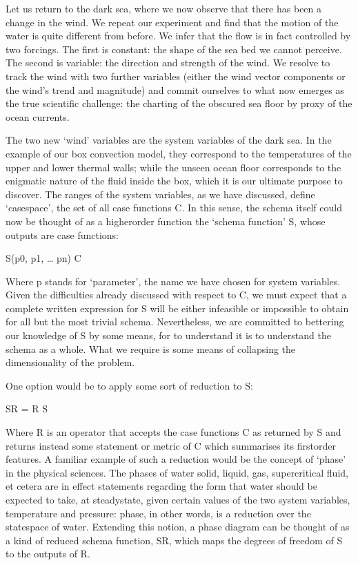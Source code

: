\documentclass[letterpaper,10pt,english]{jupyterBook}
\begin{document}
\sphinxAtStartPar
Let us return to the dark sea, where we now observe that there has been a change in the wind. We repeat our experiment and find that the motion of the water is quite different from before. We infer that the flow is in fact controlled by two forcings. The first is constant: the shape of the sea bed we cannot perceive. The second is variable: the direction and strength of the wind. We resolve to track the wind with two further variables (either the wind vector components or the wind’s trend and magnitude) and commit ourselves to what now emerges as the true scientific challenge: the charting of the obscured sea floor by proxy of the ocean currents.

\sphinxAtStartPar
The two new ‘wind’ variables are the system variables of the dark sea. In the example of our box convection model, they correspond to the temperatures of the upper and lower thermal walls; while the unseen ocean floor corresponds to the enigmatic nature of the fluid inside the box, which it is our ultimate purpose to discover. The ranges of the system variables, as we have discussed, define ‘case\sphinxhyphen{}space’, the set of all case functions C. In this sense, the schema itself could now be thought of as a higher\sphinxhyphen{}order function \sphinxhyphen{} the ‘schema function’ S, whose outputs are case functions:

\sphinxAtStartPar
S(p0, p1, … pn)  C

\sphinxAtStartPar
Where p stands for ‘parameter’, the name we have chosen for system variables. Given the difficulties already discussed with respect to C, we must expect that a complete written expression for S will be either infeasible or impossible to obtain for all but the most trivial schema. Nevertheless, we are committed to bettering our knowledge of S by some means, for to understand it is to understand the schema as a whole. What we require is some means of collapsing the dimensionality of the problem.

\sphinxAtStartPar
One option would be to apply some sort of reduction to S:

\sphinxAtStartPar
SR = R  S

\sphinxAtStartPar
Where R is an operator that accepts the case functions C as returned by S and returns instead some statement or metric of C which summarises its first\sphinxhyphen{}order features. A familiar example of such a reduction would be the concept of ‘phase’ in the physical sciences. The phases of water \sphinxhyphen{} solid, liquid, gas, supercritical fluid, et cetera \sphinxhyphen{} are in effect statements regarding the form that water should be expected to take, at steady\sphinxhyphen{}state, given certain values of the two system variables, temperature and pressure: phase, in other words, is a reduction over the state\sphinxhyphen{}space of water. Extending this notion, a phase diagram can be thought of as a kind of reduced schema function, SR, which maps the degrees of freedom of S to the outputs of R.
\end{document}
